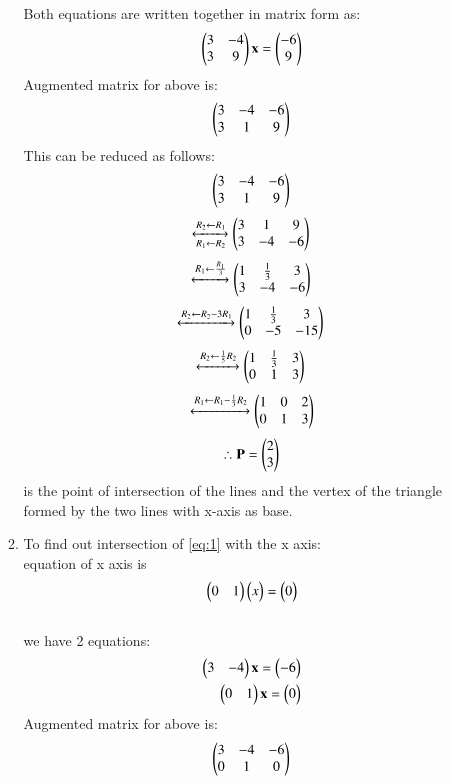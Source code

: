 \documentclass[journal,12pt,twocolumn]{IEEEtran}
\renewcommand\thesection{\arabic{section}}
\begin{document}
\begin{enumerate}[label=\thesection.\arabic*.,ref=\thesection.\theenumi]
\begin{enumerate}
Both equations are written together in matrix form as:
\begin{align}
    \begin{pmatrix}3 & -4 \\ 3 & 9\end{pmatrix}\mathbf{x}=
\begin{pmatrix}-6 \\ 9\end{pmatrix}
\end{align}
Augmented matrix for above is:
\begin{align}
    \begin{pmatrix}3 & -4 & -6\\
           3 & 1 & 9\end{pmatrix}
\end{align}
This can be reduced as follows:
 \[\begin{pmatrix}3 & -4 & -6\\
           3 & 1 & 9\end{pmatrix}\]\[
    \xleftrightarrow[R_1 \leftarrow R_2]
    {R_2 \leftarrow R_1}
    \begin{pmatrix}3 & 1 & 9\\
          3 & -4 & -6\end{pmatrix}\\\]\[
          \xleftrightarrow{R_1 \leftarrow \frac{R_1}{3}}
    \begin{pmatrix}1 &\frac{1}{3}&3\\
        3&-4&-6\end{pmatrix}\\\]\[
        \xleftrightarrow{R_2\leftarrow R_2-3R_1}
    \begin{pmatrix}1&\frac{1}{3}&3\\0&-5&-15\end{pmatrix}\\\]\[
    \xleftrightarrow{R_2\leftarrow \frac{1}{5}R_2}
    \begin{pmatrix}1&\frac{1}{3}&3\\0&1&3\end{pmatrix}\\\]\[
    \xleftrightarrow{R_1\leftarrow R_1-\frac{1}{3}R_2}
    \begin{pmatrix}1&0&2\\0&1&3\end{pmatrix}\]
\begin{align}
\therefore \mathbf{P}=\begin{pmatrix}2\\3\end{pmatrix}
\end{align}
is the point of intersection of the lines and the vertex of the triangle formed by the two lines with x-axis as base.
\item To find out intersection of \ref{eq:1} with the x axis:\\
    equation of x axis is 
    \begin{align}
        \begin{pmatrix}0&1\end{pmatrix}\begin{pmatrix}x\end{pmatrix}=\begin{pmatrix}0\end{pmatrix}
    \end{align}
    \\we have 2 equations: \begin{align}
        \begin{pmatrix}3&-4\end{pmatrix}\mathbf{x}=\begin{pmatrix}-6\end{pmatrix}\\
        \begin{pmatrix}0&1\end{pmatrix}\mathbf{x}=\begin{pmatrix}0\end{pmatrix}
    \end{align}
    Augmented matrix for above is:
\begin{align}
    \begin{pmatrix}3 & -4 & -6\\
           0 & 1 & 0\end{pmatrix}
\end{align}

\end{enumerate}
\end{enumerate}
\end{document}
